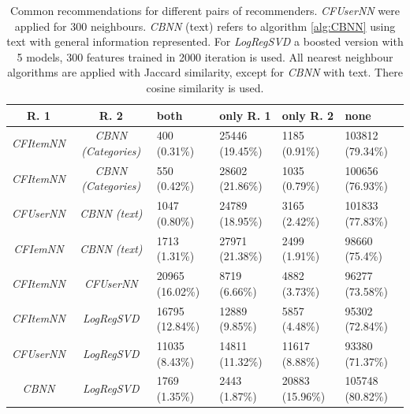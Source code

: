 \documentclass[10pt]{reportMaster}
\begin{document}
\begin{table}[h!]
	\begin{tabular}{|c|c||p{1.2cm}|p{1.2cm}|p{1.2cm}|p{1.2cm}|}
		\hline
		\textbf{R. 1}&\textbf{R. 2}&\textbf{both}&\textbf{only R. 1}&\textbf{only R. 2}&\textbf{none}\\ \hline
		\textit{CFItemNN}&\textit{CBNN (Categories)}&400 (0.31\%)&25446 (19.45\%)&1185 (0.91\%)&103812 (79.34\%)\\ \hline
		\textit{CFItemNN}&\textit{CBNN (Categories)}&550 (0.42\%)&28602 (21.86\%)&1035 (0.79\%)&100656 (76.93\%) \\ \hline
		\textit{CFUserNN}&\textit{CBNN (text)}&1047 (0.80\%)&24789 (18.95\%)&3165 (2.42\%)&101833 (77.83\%) \\ \hline
		\textit{CFIemNN}&\textit{CBNN (text)}&1713 (1.31\%)&27971 (21.38\%)&2499 (1.91\%)&98660 (75.4\%) \\ \hline
		\textit{CFItemNN}&\textit{CFUserNN}&20965 (16.02\%)&8719 (6.66\%)&4882 (3.73\%)&96277 (73.58\%) \\ \hline
		\textit{CFItemNN}&\textit{LogRegSVD}&16795 (12.84\%)&12889 (9.85\%)&5857 (4.48\%)&95302 (72.84\%) \\ \hline
		\textit{CFUserNN}&\textit{LogRegSVD}&11035 (8.43\%)&14811 (11.32\%)&11617 (8.88\%)&93380 (71.37\%) \\ \hline
		 \textit{CBNN}&\textit{LogRegSVD}&1769 (1.35\%)&2443 (1.87\%)&20883 (15.96\%)&105748 (80.82\%)\\ \hline
	\end{tabular}
	\caption[Comparison of recommendations for different algotithms]{Common recommendations for different pairs of recommenders. \textit{CFUserNN} were applied for 300 neighbours. \textit{CBNN} (text) refers to algorithm \ref{alg:CBNN} using text with general information represented. For \textit{LogRegSVD} a boosted version with 5 models, 300 features trained in 2000 iteration is used. All nearest neighbour algorithms are applied with Jaccard similarity, except for \textit{CBNN} with text. There cosine similarity is used.}
\label{tab:correlation}
\end{table}
\end{document}
